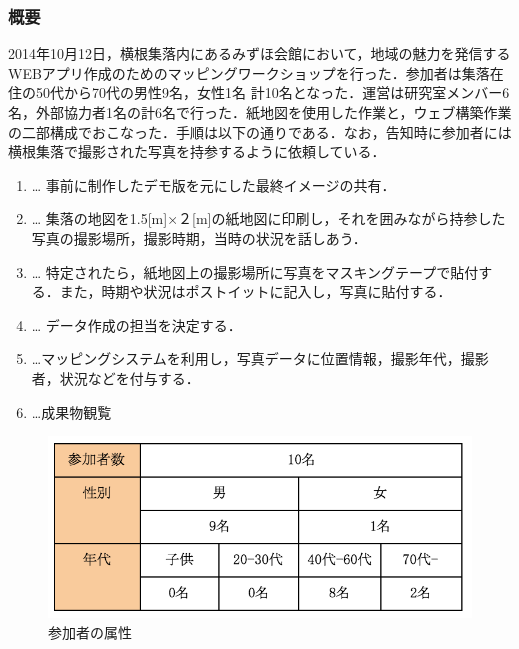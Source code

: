 \documentclass[a4paper]{jsarticle}
\begin{document}
\subsubsection{概要}
2014年10月12日，横根集落内にあるみずほ会館において，地域の魅力を発信するWEBアプリ作成のためのマッピングワークショップを行った．参加者は集落在住の50代から70代の男性9名，女性1名 計10名となった．運営は研究室メンバー6名，外部協力者1名の計6名で行った．紙地図を使用した作業と，ウェブ構築作業の二部構成でおこなった．手順は以下の通りである．なお，告知時に参加者には横根集落で撮影された写真を持参するように依頼している．\\
\begin{enumerate}
\item  … 事前に制作したデモ版を元にした最終イメージの共有．
\item  … 集落の地図を1.5[m]×２[m]の紙地図に印刷し，それを囲みながら持参した写真の撮影場所，撮影時期，当時の状況を話しあう．
\item … 特定されたら，紙地図上の撮影場所に写真をマスキングテープで貼付する．また，時期や状況はポストイットに記入し，写真に貼付する．

\item  … データ作成の担当を決定する．

\item …マッピングシステムを利用し，写真データに位置情報，撮影年代，撮影者，状況などを付与する．
\item …成果物観覧
\end{enumerate}
\begin{figure}[H]
  \begin{center}
    \includegraphics[width=0.7\hsize]{./images/19.png}
    \caption{参加者の属性}
    \label{fig:tmu_hino}
  \end{center}
\end{figure}
\end{document}
